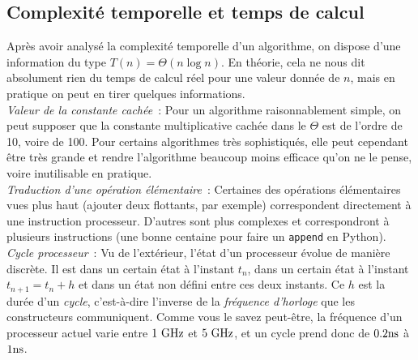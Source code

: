 \documentclass{magnolia}
\begin{document}

\subsection{Complexité temporelle et temps de calcul}

Après avoir analysé la complexité temporelle d'un algorithme, on dispose
d'une information du type $T(n) = \Theta(n \log n)$.
En théorie, cela ne nous dit absolument rien du temps de calcul réel pour
une valeur donnée de $n$, mais en pratique on peut en tirer
quelques informations.\\

\emph{Valeur de la constante cachée}~: Pour un algorithme raisonnablement
simple, on peut supposer que la constante multiplicative cachée dans le
$\Theta$ est de l'ordre de 10, voire de 100. Pour certains algorithmes
très sophistiqués, elle peut cependant être très grande et rendre l'algorithme
beaucoup moins efficace qu'on ne le pense, voire inutilisable en pratique.\\

\emph{Traduction d'une opération élémentaire}~: Certaines des opérations
élémentaires vues plus haut (ajouter deux flottants, par exemple)
correspondent directement à une instruction processeur. D'autres sont plus
complexes et correspondront à plusieurs instructions (une bonne centaine pour faire un
\verb!append! en Python).\\

\emph{Cycle processeur}~: Vu de l'extérieur, l'état d'un processeur évolue
de manière discrète. Il est dans un certain état à l'instant $t_n$, dans un
certain état à l'instant $t_{n + 1} = t_n + h$ et dans un état non défini entre
ces deux instants. Ce $h$ est la durée d'un \emph{cycle}, c'est-à-dire l'inverse
de la \emph{fréquence d'horloge} que les constructeurs communiquent. Comme vous
le savez peut-être, la fréquence d'un processeur actuel varie entre $1~{\rm GHz}$ et
$5~{\rm GHz}$, et un cycle prend donc de $0.2{\rm ns}$ à $1{\rm ns}$.\\
\end{document}
